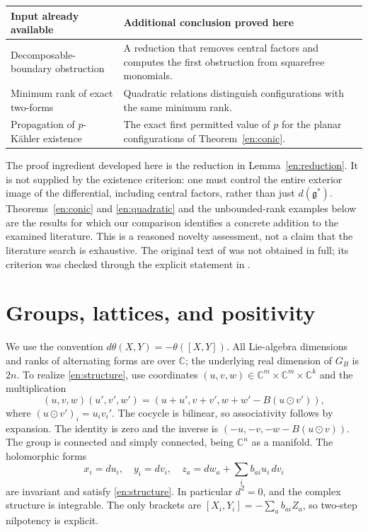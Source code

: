 \documentclass[12pt]{amsart}
\theoremstyle{definition}
\theoremstyle{remark}
\numberwithin{equation}{section}
\newcommand{\C}{\mathbb{C}}
\begin{document}
\begin{center}\small
\begin{tabular}{>{\raggedright\arraybackslash}p{4.5cm}>{\raggedright\arraybackslash}p{8.2cm}}
\hline
Input already available & Additional conclusion proved here\\\hline
Decomposable-boundary obstruction & A reduction that removes central factors
and computes the first obstruction from squarefree monomials.\\
Minimum rank of exact two-forms & Quadratic relations distinguish configurations
with the same minimum rank.\\
Propagation of $p$-K\"ahler existence & The exact first permitted value of $p$
for the planar configurations of Theorem~\ref{en:conic}.\\\hline
\end{tabular}
\end{center}

The proof ingredient developed here is the reduction in
Lemma~\ref{en:reduction}. It is not supplied by the existence criterion:
one must control the entire exterior image of the differential, including
central factors, rather than just $d(\mathfrak g^*)$.
Theorems~\ref{en:conic} and \ref{en:quadratic} and the unbounded-rank examples
below are the results for which our comparison identifies a concrete
addition to the examined literature. This is a reasoned novelty assessment,
not a claim that the literature search is exhaustive. The original text of
\cite{en:AB91} was not obtained in full; its criterion was checked through the
explicit statement in \cite{en:LGM26}.

\section{Groups, lattices, and positivity}\label{en:groups}
We use the convention $d\theta(X,Y)=-\theta([X,Y])$.
All Lie-algebra dimensions and ranks of alternating forms are over $\C$;
the underlying real dimension of $G_B$ is $2n$.
To realize \eqref{en:structure}, use coordinates
$(u,v,w)\in\C^m\times\C^m\times\C^k$ and the multiplication
\begin{equation}\label{en:law}
 (u,v,w)(u',v',w')
 =\left(u+u',v+v',w+w'-B(u\odot v')\right),
\end{equation}
where $(u\odot v')_i=u_i v_i'$.
The cocycle is bilinear, so associativity follows by expansion.
The identity is zero and the inverse is
$(-u,-v,-w-B(u\odot v))$. The group is connected and simply connected,
being $\C^n$ as a manifold. The holomorphic forms
\[
 x_i=du_i,\quad y_i=dv_i,\quad
 z_a=dw_a+\sum_i b_{ai}u_i\,dv_i
\]
are invariant and satisfy \eqref{en:structure}. In particular $d^2=0$,
and the complex structure is integrable. The only brackets are
$[X_i,Y_i]=-\sum_a b_{ai}Z_a$, so two-step nilpotency is explicit.
\end{document}
